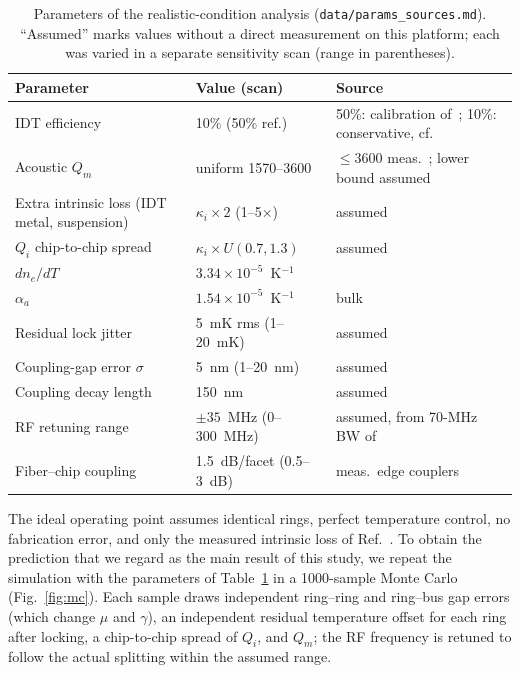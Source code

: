 \documentclass[aps,prapplied,reprint,superscriptaddress,amsmath,amssymb,floatfix]{revtex4-2}
\begin{document}
\begin{table}[t]
\caption{Parameters of the realistic-condition analysis (\texttt{data/params\_sources.md}). ``Assumed'' marks values without a direct measurement on this platform; each was varied in a separate sensitivity scan (range in parentheses).}
\label{tab:real}
\begin{ruledtabular}
\footnotesize
\begin{tabular}{p{}p{}p{}}
Parameter & Value (scan) & Source \\
\hline
IDT efficiency & 10\% (50\% ref.) & 50\%: calibration of~\cite{Shao2019}; 10\%: conservative, cf.~\cite{Xu2025b}\\
Acoustic $Q_m$ & uniform 1570--3600 & $\le3600$ meas.~\cite{Shao2019}; lower bound assumed\\
Extra intrinsic loss (IDT metal, suspension) & $\kappa_i\times2$ (1--5$\times$) & assumed\\
$Q_i$ chip-to-chip spread & $\kappa_i\times U(0.7,1.3)$ & assumed\\
$dn_e/dT$ & $3.34\times10^{-5}$~K$^{-1}$ & \cite{Moretti2005}\\
$\alpha_a$ & $1.54\times10^{-5}$~K$^{-1}$ & bulk~\cite{KimSmith1969}\\
Residual lock jitter & 5~mK rms (1--20~mK) & assumed\\
Coupling-gap error $\sigma$ & 5~nm (1--20~nm) & assumed\\
Coupling decay length & 150~nm & assumed\\
RF retuning range & $\pm35$~MHz (0--300~MHz) & assumed, from 70-MHz BW of~\cite{Shao2020}\\
Fiber--chip coupling & 1.5~dB/facet (0.5--3~dB) & meas.\ edge couplers~\cite{Jia2023,HuC2020edge}\\
\end{tabular}
\end{ruledtabular}
\end{table}

The ideal operating point assumes identical rings, perfect temperature control, no fabrication error, and only the measured intrinsic loss of Ref.~\cite{Shao2019}. To obtain the prediction that we regard as the main result of this study, we repeat the simulation with the parameters of Table~\ref{tab:real} in a 1000-sample Monte Carlo (Fig.~\ref{fig:mc}). Each sample draws independent ring--ring and ring--bus gap errors (which change $\mu$ and $\gamma$), an independent residual temperature offset for each ring after locking, a chip-to-chip spread of $Q_i$, and $Q_m$; the RF frequency is retuned to follow the actual splitting within the assumed range.
\end{document}
